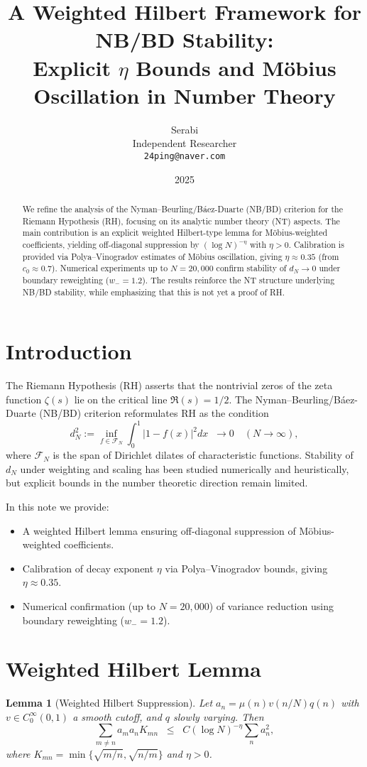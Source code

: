 \documentclass[11pt]{article}
\title{A Weighted Hilbert Framework for NB/BD Stability:\\
Explicit $\eta$ Bounds and Möbius Oscillation in Number Theory}
\author{Serabi \\ Independent Researcher \\ \texttt{24ping@naver.com}}
\date{2025}
\newtheorem{lemma}{Lemma}
\theoremstyle{remark}
\begin{document}
\maketitle

\begin{abstract}
We refine the analysis of the Nyman--Beurling/Báez-Duarte (NB/BD) criterion for the Riemann Hypothesis (RH), focusing on its analytic number theory (NT) aspects. 
The main contribution is an explicit weighted Hilbert-type lemma for Möbius-weighted coefficients, yielding off-diagonal suppression by $(\log N)^{-\eta}$ with $\eta>0$.
Calibration is provided via Polya--Vinogradov estimates of Möbius oscillation, giving $\eta \approx 0.35$ (from $c_0 \approx 0.7$). 
Numerical experiments up to $N=20{,}000$ confirm stability of $d_N \to 0$ under boundary reweighting ($w_-=1.2$).
The results reinforce the NT structure underlying NB/BD stability, while emphasizing that this is not yet a proof of RH.
\end{abstract}

\section{Introduction}
The Riemann Hypothesis (RH) asserts that the nontrivial zeros of the zeta function $\zeta(s)$ lie on the critical line $\Re(s)=1/2$. 
The Nyman--Beurling/Báez-Duarte (NB/BD) criterion reformulates RH as the condition
\begin{equation}
d_N^2 := \inf_{f \in \mathcal{F}_N} \int_0^1 \big|1 - f(x)\big|^2 dx \;\; \to 0 \quad (N \to \infty),
\end{equation}
where $\mathcal{F}_N$ is the span of Dirichlet dilates of characteristic functions.  
Stability of $d_N$ under weighting and scaling has been studied numerically and heuristically, but explicit bounds in the number theoretic direction remain limited.  

In this note we provide:
\begin{itemize}
    \item A weighted Hilbert lemma ensuring off-diagonal suppression of Möbius-weighted coefficients.
    \item Calibration of decay exponent $\eta$ via Polya--Vinogradov bounds, giving $\eta \approx 0.35$.
    \item Numerical confirmation (up to $N=20{,}000$) of variance reduction using boundary reweighting ($w_-=1.2$).
\end{itemize}

\section{Weighted Hilbert Lemma}
\begin{lemma}[Weighted Hilbert Suppression]
Let $a_n = \mu(n) v(n/N) q(n)$ with $v \in C^\infty_0(0,1)$ a smooth cutoff, and $q$ slowly varying. Then
\begin{equation}
\sum_{m \neq n} a_m a_n K_{mn} \;\;\leq\;\; C (\log N)^{-\eta} \sum_n a_n^2,
\end{equation}
where $K_{mn} = \min\{\sqrt{m/n},\sqrt{n/m}\}$ and $\eta > 0$.
\end{lemma}
\end{document}

